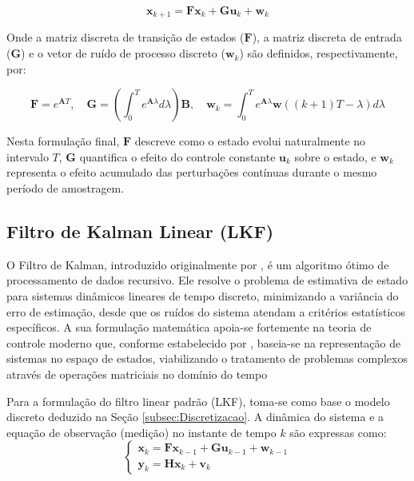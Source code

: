 \documentclass[a4paper,12pt]{article}
\begin{document}
\begin{equation}
    \mathbf{x}_{k+1} = \mathbf{F}\mathbf{x}_k + \mathbf{G}\mathbf{u}_k + \mathbf{w}_k
    \label{eq:modelo_discreto_final}
\end{equation}

Onde a matriz discreta de transição de estados ($\mathbf{F}$), a matriz discreta de entrada ($\mathbf{G}$) e o vetor de ruído de processo discreto ($\mathbf{w}_k$) são definidos, respectivamente, por:

\begin{equation}
    \mathbf{F} = e^{\mathbf{A}T}, \quad \mathbf{G} = \left( \int_{0}^{T} e^{\mathbf{A}\lambda} d\lambda \right) \mathbf{B}, \quad \mathbf{w}_k = \int_{0}^{T} e^{\mathbf{A}\lambda} \mathbf{w}((k+1)T - \lambda) d\lambda
\end{equation}

Nesta formulação final, $\mathbf{F}$ descreve como o estado evolui naturalmente no intervalo $T$, $\mathbf{G}$ quantifica o efeito do controle constante $\mathbf{u}_k$ sobre o estado, e $\mathbf{w}_k$ representa o efeito acumulado das perturbações contínuas durante o mesmo período de amostragem.

\subsection{Filtro de Kalman Linear (LKF)}
\label{subsec:FiltroLKF}

O Filtro de Kalman, introduzido originalmente por , é um algoritmo ótimo de processamento de dados recursivo. Ele resolve o problema de estimativa de estado para sistemas dinâmicos lineares de tempo discreto, minimizando a variância do erro de estimação, desde que os ruídos do sistema atendam a critérios estatísticos específicos. A sua formulação matemática apoia-se fortemente na teoria de controle moderno que, conforme estabelecido por , baseia-se na representação de sistemas no espaço de estados, viabilizando o tratamento de problemas complexos através de operações matriciais no domínio do tempo

Para a formulação do filtro linear padrão (LKF), toma-se como base o modelo discreto deduzido na Seção \ref{subsec:Discretizacao}. A dinâmica do sistema e a equação de observação (medição) no instante de tempo $k$ são expressas como:
\begin{equation}
    \begin{cases}
        \mathbf{x}_k = \mathbf{F}\mathbf{x}_{k-1} + \mathbf{G}\mathbf{u}_{k-1} + \mathbf{w}_{k-1} \\
        \mathbf{y}_k = \mathbf{H}\mathbf{x}_k + \mathbf{v}_k
    \end{cases}
    \label{eq:modelo_discreto_kf}
\end{equation}
\end{document}
